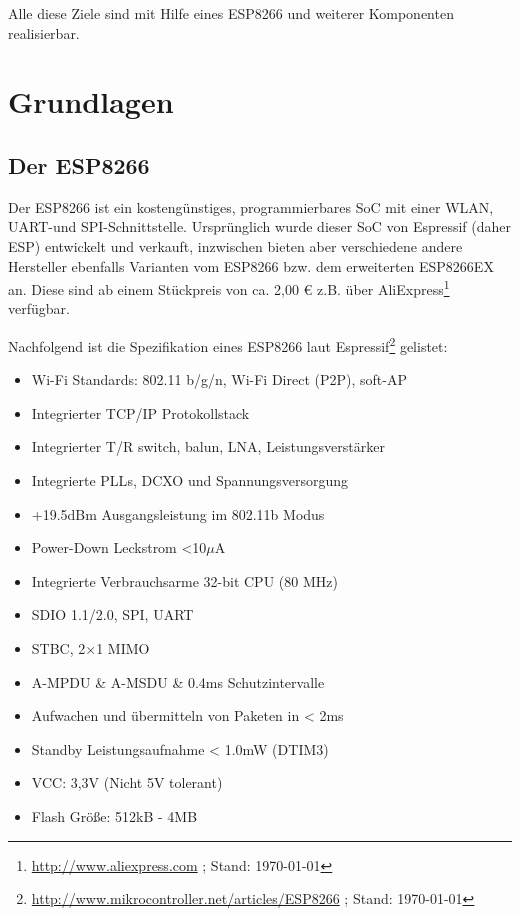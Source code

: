 Alle diese Ziele sind mit Hilfe eines ESP8266 und weiterer Komponenten realisierbar.

\section{Grundlagen}
\subsection{Der ESP8266}
Der ESP8266 ist ein kostengünstiges, programmierbares \ac{SoC} mit einer \acs{WLAN}, \acs{UART}-und \acs{SPI}-Schnittstelle.
Ursprünglich wurde dieser \acs{SoC} von Espressif (daher ESP) entwickelt und verkauft, inzwischen bieten aber verschiedene andere Hersteller ebenfalls Varianten vom ESP8266 bzw. dem erweiterten ESP8266EX an.
Diese sind ab einem Stückpreis von ca. 2,00 € z.B. über AliExpress\footnote{\url{http://www.aliexpress.com} ; Stand: \today} verfügbar.

Nachfolgend ist die Spezifikation eines ESP8266 laut Espressif\footnote{\url{http://www.mikrocontroller.net/articles/ESP8266} ; Stand: \today} gelistet:

\begin{itemize}
    \item Wi-Fi Standards: 802.11 b/g/n, Wi-Fi Direct (\acs{P2P}), \acs{soft-AP}
    \item Integrierter TCP/IP Protokollstack
    \item Integrierter \acs{T/R} switch, \acs{balun}, \acs{LNA}, Leistungsverstärker
    \item Integrierte \acs{PLL}s, \acs{DCXO} und Spannungsversorgung
    \item +19.5dBm Ausgangsleistung im 802.11b Modus
    \item Power-Down Leckstrom <10$\mu$A
    \item Integrierte Verbrauchsarme 32-bit CPU (80 MHz)
    \item \acs{SDIO} 1.1/2.0, \acs{SPI}, \acs{UART}
    \item \acs{STBC}, 2×1 \acs{MIMO}
    \item \acs{A-MPDU} \& \acs{A-MSDU} \& 0.4ms Schutzintervalle
    \item Aufwachen und übermitteln von Paketen in < 2ms
    \item Standby Leistungsaufnahme < 1.0mW (\acs{DTIM3})
    \item\acs{VCC}: 3,3V (Nicht 5V tolerant)
    \item Flash Größe: 512kB - 4MB 
\end{itemize}

